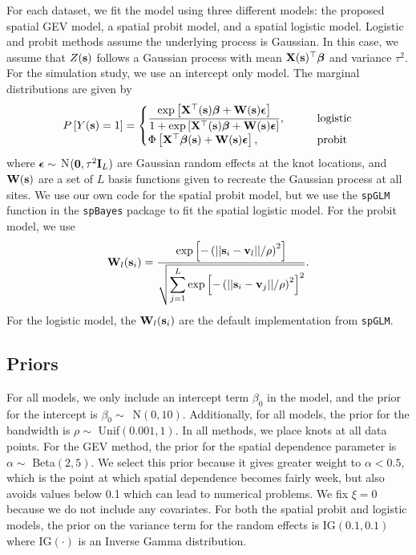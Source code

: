 For each dataset, we fit the model using three different models: the proposed spatial GEV model, a spatial probit model, and a spatial logistic model.
Logistic and probit methods assume the underlying process is Gaussian.
In this case, we assume that $Z(\mathbf{s})$ follows a Gaussian process with mean $\mathbf{X}(\mathbf{s})^\top \mbox{\boldmath $\beta$}$ and variance $\tau^2$.
For the simulation study, we use an intercept only model.
The marginal distributions are given by
\begin{align}
P\left[Y(\mathbf{s}) = 1\right] = \begin{cases}
\displaystyle \frac{\exp\left[\mathbf{X}^\top(\mathbf{s}) \mbox{\boldmath $\beta$} + \mathbf{W} (\mathbf{s}) \mbox{\boldmath $\epsilon$} \right]}{1 + \exp\left[\mathbf{X}^\top(\mathbf{s}) \mbox{\boldmath $\beta$} + \mathbf{W} (\mathbf{s}) \mbox{\boldmath $\epsilon$} \right]}, \qquad &\text{logistic}\\
\Phi\left[\mathbf{X}^\top \mbox{\boldmath $\beta$} (\mathbf{s}) + \mathbf{W} (\mathbf{s}) \mbox{\boldmath $\epsilon$} \right], \qquad &\text{probit}
\end{cases}
\end{align}
where $\mbox{\boldmath $\epsilon$} \sim$ N$(\mathbf{0}, \tau^2 \mathbf{I}_L)$ are Gaussian random effects at the knot locations, and $\mathbf{W}(\mathbf{s})$ are a set of $L$ basis functions given to recreate the Gaussian process at all sites.
We use our own code for the spatial probit model, but we use the \texttt{spGLM} function in the \texttt{spBayes} package \citep{Finley2015} to fit the spatial logistic model.
For the probit model, we use
\begin{align}
\mathbf{W}_l(\mathbf{s}_i) = \frac{\exp\left[-\left(||\mathbf{s}_i-\mathbf{v}_l||/\rho\right)^2\right]}
{\sqrt{\displaystyle \sum_{j=1}^L\exp\left[-\left(||\mathbf{s}_i-\mathbf{v}_j||/\rho\right)^2\right]^2}}.
\end{align}
For the logistic model, the $\mathbf{W}_l(\mathbf{s}_i)$ are the default implementation from \texttt{spGLM}.

\subsection{Priors} \label{rbs:simpriors}

For all models, we only include an intercept term $\beta_0$ in the model, and the prior for the intercept is \mbox{$\beta_0 \sim$ N$(0, 10)$}.
Additionally, for all models, the prior for the bandwidth is $\rho \sim$ Unif$(0.001, 1)$.
In all methods, we place knots at all data points.
For the GEV method, the prior for the spatial dependence parameter is $\alpha \sim$ Beta$(2, 5)$.
We select this prior because it gives greater weight to $\alpha < 0.5$, which is the point at which spatial dependence becomes fairly week, but also avoids values below 0.1 which can lead to numerical problems.
We fix $\xi = 0$ because we do not include any covariates.
For both the spatial probit and logistic models, the prior on the variance term for the random effects is IG$(0.1, 0.1)$ where IG$(\cdot)$ is an Inverse Gamma distribution.

